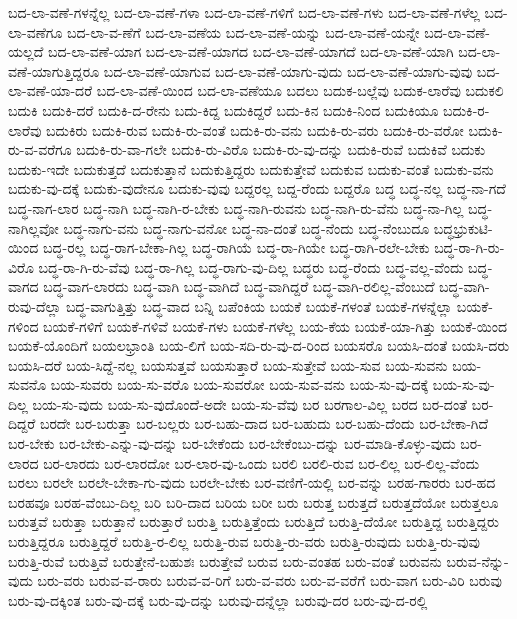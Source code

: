 {ಬದ-ಲಾ-ವಣೆ-ಗಳನ್ನೆಲ್ಲ
ಬದ-ಲಾ-ವಣೆ-ಗಳಾ
ಬದ-ಲಾ-ವಣೆ-ಗಳಿಗೆ
ಬದ-ಲಾ-ವಣೆ-ಗಳು
ಬದ-ಲಾ-ವಣೆ-ಗಳೆಲ್ಲ
ಬದ-ಲಾ-ವಣೆಗೂ
ಬದ-ಲಾ-ವ-ಣೆಗೆ
ಬದ-ಲಾ-ವಣೆಯ
ಬದ-ಲಾ-ವಣೆ-ಯನ್ನು
ಬದ-ಲಾ-ವಣೆ-ಯನ್ನೇ
ಬದ-ಲಾ-ವಣೆ-ಯಲ್ಲದೆ
ಬದ-ಲಾ-ವಣೆ-ಯಾಗ
ಬದ-ಲಾ-ವಣೆ-ಯಾಗದ
ಬದ-ಲಾ-ವಣೆ-ಯಾಗದೆ
ಬದ-ಲಾ-ವಣೆ-ಯಾಗಿ
ಬದ-ಲಾ-ವಣೆ-ಯಾಗುತ್ತಿದ್ದರೂ
ಬದ-ಲಾ-ವಣೆ-ಯಾಗುವ
ಬದ-ಲಾ-ವಣೆ-ಯಾಗು-ವುದು
ಬದ-ಲಾ-ವಣೆ-ಯಾಗು-ವುವು
ಬದ-ಲಾ-ವಣೆ-ಯಾ-ದರೆ
ಬದ-ಲಾ-ವಣೆ-ಯಿಂದ
ಬದ-ಲಾ-ವಣೆಯೂ
ಬದಲು
ಬದುಕ-ಬಲ್ಲೆವು
ಬದುಕ-ಲಾರೆವು
ಬದುಕಲಿ
ಬದುಕಿ
ಬದುಕಿ-ದರೆ
ಬದುಕಿ-ದ-ರೇನು
ಬದು-ಕಿದ್ದ
ಬದುಕಿದ್ದರೆ
ಬದು-ಕಿನ
ಬದುಕಿ-ನಿಂದ
ಬದುಕಿಯೂ
ಬದುಕಿ-ರ-ಲಾರೆವು
ಬದುಕಿರು
ಬದುಕಿ-ರುವ
ಬದುಕಿ-ರು-ವಂತೆ
ಬದುಕಿ-ರು-ವನು
ಬದುಕಿ-ರು-ವರು
ಬದುಕಿ-ರು-ವರೋ
ಬದುಕಿ-ರು-ವ-ವರೆಗೂ
ಬದುಕಿ-ರು-ವಾ-ಗಲೇ
ಬದುಕಿ-ರು-ವಿರೊ
ಬದುಕಿ-ರು-ವು-ದನ್ನು
ಬದುಕಿ-ರುವೆ
ಬದುಕಿವೆ
ಬದುಕು
ಬದುಕು-ಇದೇ
ಬದುಕುತ್ತದೆ
ಬದುಕುತ್ತಾನೆ
ಬದುಕುತ್ತಿದ್ದರು
ಬದುಕುತ್ತೇವೆ
ಬದುಕುವ
ಬದುಕು-ವಂತೆ
ಬದುಕು-ವನು
ಬದುಕು-ವು-ದಕ್ಕೆ
ಬದುಕು-ವುದೇನೂ
ಬದುಕು-ವುವು
ಬದ್ದರಲ್ಲ
ಬದ್ದ-ರೆಂದು
ಬದ್ದರೊ
ಬದ್ಧ
ಬದ್ಧ-ನಲ್ಲ
ಬದ್ಧ-ನಾ-ಗದೆ
ಬದ್ಧ-ನಾಗ-ಲಾರ
ಬದ್ಧ-ನಾಗಿ
ಬದ್ಧ-ನಾಗಿ-ರ-ಬೇಕು
ಬದ್ಧ-ನಾಗಿ-ರುವನು
ಬದ್ಧ-ನಾಗಿ-ರು-ವೆನು
ಬದ್ಧ-ನಾ-ಗಿಲ್ಲ
ಬದ್ಧ-ನಾಗಿಲ್ಲವೋ
ಬದ್ಧ-ನಾಗು-ವನು
ಬದ್ಧ-ನಾಗು-ವನೋ
ಬದ್ಧ-ನಾ-ದಂತೆ
ಬದ್ಧ-ನೆಂದು
ಬದ್ಧ-ನೆಂಬುದೂ
ಬದ್ಧಭ್ರುಕುಟಿ-ಯಿಂದ
ಬದ್ಧ-ರಲ್ಲ
ಬದ್ಧ-ರಾಗ-ಬೇಕಾ-ಗಿಲ್ಲ
ಬದ್ಧ-ರಾಗಿಯೆ
ಬದ್ಧ-ರಾ-ಗಿಯೇ
ಬದ್ಧ-ರಾಗಿ-ರಲೇ-ಬೇಕು
ಬದ್ಧ-ರಾ-ಗಿ-ರು-ವಿರೊ
ಬದ್ಧ-ರಾ-ಗಿ-ರು-ವೆವು
ಬದ್ಧ-ರಾ-ಗಿಲ್ಲ
ಬದ್ಧ-ರಾಗು-ವು-ದಿಲ್ಲ
ಬದ್ಧರು
ಬದ್ಧ-ರೆಂದು
ಬದ್ಧ-ವಲ್ಲ-ವೆಂದು
ಬದ್ಧ-ವಾಗದ
ಬದ್ಧ-ವಾಗ-ಲಾರದು
ಬದ್ಧ-ವಾಗಿ
ಬದ್ಧ-ವಾಗಿದೆ
ಬದ್ಧ-ವಾಗಿದ್ದರೆ
ಬದ್ಧ-ವಾಗಿ-ರಲಿಲ್ಲ-ವೆಂಬುದೆ
ಬದ್ಧ-ವಾಗಿ-ರುವು-ದೆಲ್ಲಾ
ಬದ್ಧ-ವಾಗುತ್ತಿತ್ತು
ಬದ್ಧ-ವಾದ
ಬನ್ನಿ
ಬಪೆಂಕಿಯ
ಬಯಕೆ
ಬಯಕೆ-ಗಳಂತೆ
ಬಯಕೆ-ಗಳನ್ನೆಲ್ಲಾ
ಬಯಕೆ-ಗಳಿಂದ
ಬಯಕೆ-ಗಳಿಗೆ
ಬಯಕೆ-ಗಳಿವೆ
ಬಯಕೆ-ಗಳು
ಬಯಕೆ-ಗಳೆಲ್ಲ
ಬಯ-ಕೆಯ
ಬಯಕೆ-ಯಾ-ಗಿತ್ತು
ಬಯಕೆ-ಯಿಂದ
ಬಯಕೆ-ಯೊಂದಿಗೆ
ಬಯಲಭ್ರಾಂತಿ
ಬಯ-ಲಿಗೆ
ಬಯ-ಸದಿ-ರು-ವು-ದ-ರಿಂದ
ಬಯಸರೊ
ಬಯಸಿ-ದಂತೆ
ಬಯಸಿ-ದರು
ಬಯಸಿ-ದರೆ
ಬಯ-ಸಿದ್ದೆ-ನಲ್ಲ
ಬಯಸುತ್ತವೆ
ಬಯಸುತ್ತಾರೆ
ಬಯ-ಸುತ್ತೇವೆ
ಬಯ-ಸುವ
ಬಯ-ಸುವನು
ಬಯ-ಸುವನೊ
ಬಯ-ಸುವರು
ಬಯ-ಸು-ವರೊ
ಬಯ-ಸುವರೋ
ಬಯ-ಸುವ-ವನು
ಬಯ-ಸು-ವು-ದಕ್ಕೆ
ಬಯ-ಸು-ವು-ದಿಲ್ಲ
ಬಯ-ಸು-ವುದು
ಬಯ-ಸು-ವುದೊಂದೆ-ಅದೇ
ಬಯ-ಸು-ವೆವು
ಬರ
ಬರಗಾಲ-ವಿಲ್ಲ
ಬರದ
ಬರ-ದಂತೆ
ಬರ-ದಿದ್ದರೆ
ಬರದೇ
ಬರ-ಬರುತ್ತಾ
ಬರ-ಬಲ್ಲರು
ಬರ-ಬಹು-ದಾದ
ಬರ-ಬಹುದು
ಬರ-ಬಹು-ದೆಂದು
ಬರ-ಬೇಕಾ-ಗಿದೆ
ಬರ-ಬೇಕು
ಬರ-ಬೇಕು-ಎನ್ನು-ವು-ದನ್ನು
ಬರ-ಬೇಕೆಂದು
ಬರ-ಬೇಕೆಂಬು-ದನ್ನು
ಬರ-ಮಾಡಿ-ಕೊಳ್ಳು-ವುದು
ಬರ-ಲಾರದ
ಬರ-ಲಾರದು
ಬರ-ಲಾರದೋ
ಬರ-ಲಾರ-ವು-ಒಂದು
ಬರಲಿ
ಬರಲಿ-ರುವ
ಬರ-ಲಿಲ್ಲ
ಬರ-ಲಿಲ್ಲ-ವೆಂದು
ಬರಲು
ಬರಲೇ
ಬರಲೇ-ಬೇಕಾ-ಗು-ವುದು
ಬರಲೇ-ಬೇಕು
ಬರ-ವಣಿಗೆ-ಯಲ್ಲಿ
ಬರ-ವನ್ನು
ಬರಹ-ಗಾರರು
ಬರ-ಹದ
ಬರಹವೂ
ಬರಹ-ವೆಂಬು-ದಿಲ್ಲ
ಬರಿ
ಬರಿ-ದಾದ
ಬರಿಯ
ಬರೀ
ಬರು
ಬರುತ್ತ
ಬರುತ್ತದೆ
ಬರುತ್ತದೆಯೋ
ಬರುತ್ತಲೂ
ಬರುತ್ತವೆ
ಬರುತ್ತಾ
ಬರುತ್ತಾನೆ
ಬರುತ್ತಾರೆ
ಬರುತ್ತಿ
ಬರುತ್ತಿತ್ತೆಂದು
ಬರುತ್ತಿದೆ
ಬರುತ್ತಿ-ದೆಯೋ
ಬರುತ್ತಿದ್ದ
ಬರುತ್ತಿದ್ದರು
ಬರುತ್ತಿದ್ದರೂ
ಬರುತ್ತಿದ್ದರೆ
ಬರುತ್ತಿ-ರ-ಲಿಲ್ಲ
ಬರುತ್ತಿ-ರುವ
ಬರುತ್ತಿ-ರು-ವರು
ಬರುತ್ತಿ-ರುವುದು
ಬರುತ್ತಿ-ರು-ವುವು
ಬರುತ್ತಿ-ರುವೆ
ಬರುತ್ತಿವೆ
ಬರುತ್ತೇನೆ-ಬಹುಶಃ
ಬರುತ್ತೇವೆ
ಬರುವ
ಬರು-ವಂತಹ
ಬರು-ವಂತೆ
ಬರುವನು
ಬರುವ-ನೆನ್ನು-ವುದು
ಬರು-ವರು
ಬರುವ-ವ-ರಾರು
ಬರುವ-ವ-ರಿಗೆ
ಬರು-ವ-ವರು
ಬರು-ವ-ವರೆಗೆ
ಬರು-ವಾಗ
ಬರು-ವಿರಿ
ಬರುವು
ಬರು-ವು-ದಕ್ಕಿಂತ
ಬರು-ವು-ದಕ್ಕೆ
ಬರು-ವು-ದನ್ನು
ಬರುವು-ದನ್ನೆಲ್ಲಾ
ಬರುವು-ದರ
ಬರು-ವು-ದ-ರಲ್ಲಿ
}
